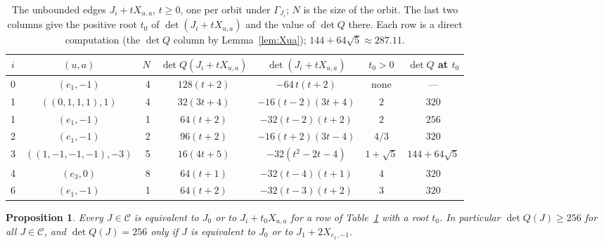 \documentclass[11pt]{amsart}
\newtheorem{proposition}[theorem]{Proposition}
\theoremstyle{definition}
\theoremstyle{remark}
\numberwithin{equation}{section}
\numberwithin{table}{section}
\numberwithin{figure}{section}
\newcommand{\cand}{\mathcal{C}}
\begin{document}
\begin{table}[t]
\centering
\small
\renewcommand{\arraystretch}{1.25}
\begin{tabular}{@{}c c r c c c c@{}}
\toprule
$i$ & $(u,a)$ & $N$ & $\det Q(J_i+tX_{u,a})$ & $\det(J_i+tX_{u,a})$ & $t_0>0$ & $\det Q$ at $t_0$\\
\midrule
0 & $(e_1,-1)$ & 4 & $128(t+2)$ & $-64\,t(t+2)$ & none & ---\\
1 & $((0,1,1,1),1)$ & 4 & $32(3t+4)$ & $-16(t-2)(3t+4)$ & $2$ & $320$\\
1 & $(e_1,-1)$ & 1 & $64(t+2)$ & $-32(t-2)(t+2)$ & $2$ & $256$\\
2 & $(e_1,-1)$ & 2 & $96(t+2)$ & $-16(t+2)(3t-4)$ & $4/3$ & $320$\\
3 & $((1,-1,-1,-1),-3)$ & 5 & $16(4t+5)$ & $-32(t^2-2t-4)$ & $1+\sqrt5$ & $144+64\sqrt5$\\
4 & $(e_3,0)$ & 8 & $64(t+1)$ & $-32(t-4)(t+1)$ & $4$ & $320$\\
6 & $(e_1,-1)$ & 1 & $64(t+2)$ & $-32(t-3)(t+2)$ & $3$ & $320$\\
\bottomrule
\end{tabular}
\caption{The unbounded edges $J_i+tX_{u,a}$, $t\ge0$, one per orbit under $\Gamma_{J_i}$; $N$ is the size of the orbit. The last two columns give the positive root $t_0$ of $\det(J_i+tX_{u,a})$ and the value of $\det Q$ there. Each row is a direct computation (the $\det Q$ column by Lemma~\ref{lem:Xua}); $144+64\sqrt5\approx287.11$.}
\label{tab:unbounded}
\end{table}

\begin{proposition}\label{prop:candidates}
Every $J\in\cand$ is equivalent to $J_0$ or to $J_i+t_0X_{u,a}$ for a row of Table~\ref{tab:unbounded} with a root $t_0$. In particular $\det Q(J)\ge256$ for all $J\in\cand$, and $\det Q(J)=256$ only if $J$ is equivalent to $J_0$ or to $J_1+2X_{e_1,-1}$.
\end{proposition}
\end{document}
